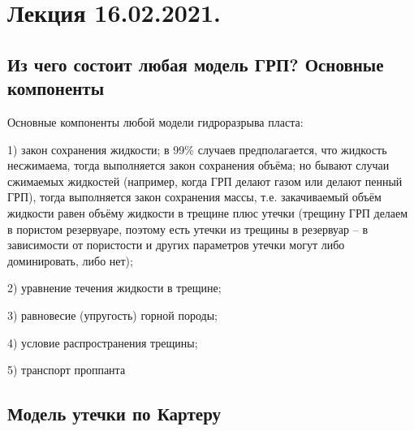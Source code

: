 \documentclass[main.tex]{subfiles}
\begin{document}

\section{Лекция 16.02.2021.}

\subsection{Из чего состоит любая модель ГРП? Основные компоненты}

Основные компоненты любой модели гидроразрыва пласта:

1) закон сохранения жидкости; в 99\% случаев предполагается, что жидкость несжимаема, тогда выполняется закон сохранения объёма; но бывают случаи сжимаемых жидкостей (например, когда ГРП делают газом или делают пенный ГРП), тогда выполняется закон сохранения массы, т.е. закачиваемый объём жидкости равен объёму жидкости в трещине плюс утечки (трещину ГРП делаем в пористом резервуаре, поэтому есть утечки из трещины в резервуар -- в зависимости от пористости и других параметров утечки могут либо доминировать, либо нет);

2) уравнение течения жидкости в трещине; 

3) равновесие (упругость) горной породы;

4) условие распространения трещины;

5) транспорт проппанта

\subsection{Модель утечки по Картеру}
\end{document}
